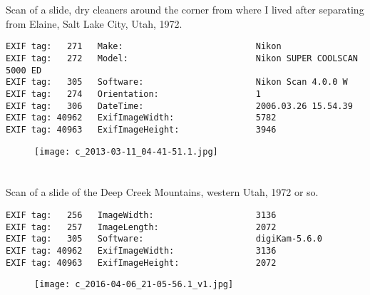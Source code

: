 \section{\protect{}}
\noindent Scan of a slide, dry cleaners around the corner from where I lived after separating from Elaine, Salt Lake City, Utah, 1972.
\noindent
\begin{lstlisting}
EXIF tag:   271   Make:                          Nikon
EXIF tag:   272   Model:                         Nikon SUPER COOLSCAN 5000 ED
EXIF tag:   305   Software:                      Nikon Scan 4.0.0 W
EXIF tag:   274   Orientation:                   1
EXIF tag:   306   DateTime:                      2006.03.26 15.54.39
EXIF tag: 40962   ExifImageWidth:                5782
EXIF tag: 40963   ExifImageHeight:               3946

\end{lstlisting}
\clearpage
\begin{figure}
\raggedleft
\texttt{[image: c\_2013-03-11\_04-41-51.1.jpg]}
\end{figure}


\clearpage
\section{\protect{}}
\noindent Scan of a slide of the Deep Creek Mountains, western Utah, 1972 or so.
\noindent
\begin{lstlisting}
EXIF tag:   256   ImageWidth:                    3136
EXIF tag:   257   ImageLength:                   2072
EXIF tag:   305   Software:                      digiKam-5.6.0
EXIF tag: 40962   ExifImageWidth:                3136
EXIF tag: 40963   ExifImageHeight:               2072

\end{lstlisting}
\clearpage
\begin{figure}
\raggedleft
\texttt{[image: c\_2016-04-06\_21-05-56.1\_v1.jpg]}
\end{figure}


\clearpage
